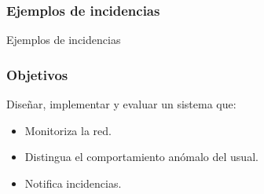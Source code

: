 \documentclass{beamer}
\begin{document}
\begin{frame}
\frametitle{Ejemplos de incidencias}
\begin{block}{Ejemplos de incidencias}


\begin{figure}[ht]
\centering
{}
\qquad
{}
\end{figure}
\end{block}
\end{frame}



\begin{frame}
\frametitle{Objetivos}

Diseñar, implementar y evaluar un sistema que:
\begin{itemize}
\item Monitoriza la red.
\item Distingua el comportamiento anómalo del usual.
\item Notifica incidencias.
\end{itemize}

\end{frame}
\end{document}
